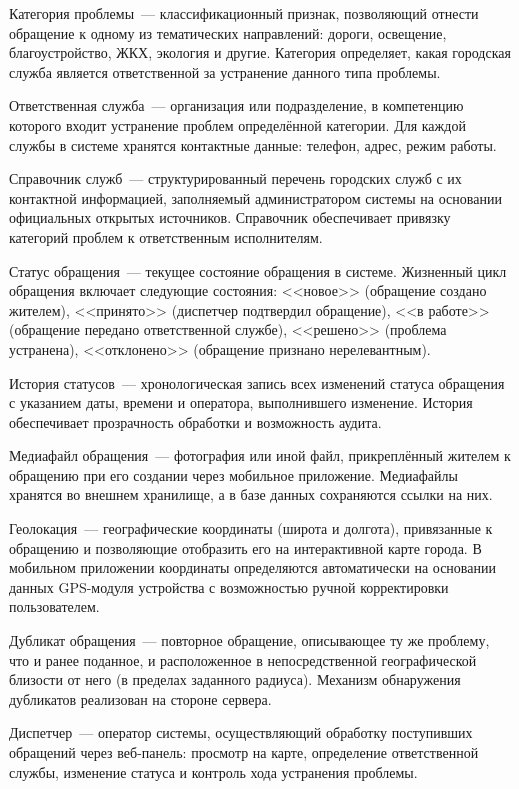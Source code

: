 Категория проблемы~--- классификационный признак, позволяющий отнести обращение к одному из тематических направлений: дороги, освещение, благоустройство, ЖКХ, экология и другие. Категория определяет, какая городская служба является ответственной за устранение данного типа проблемы.

Ответственная служба~--- организация или подразделение, в компетенцию которого входит устранение проблем определённой категории. Для каждой службы в системе хранятся контактные данные: телефон, адрес, режим работы.

Справочник служб~--- структурированный перечень городских служб с их контактной информацией, заполняемый администратором системы на основании официальных открытых источников. Справочник обеспечивает привязку категорий проблем к ответственным исполнителям.

Статус обращения~--- текущее состояние обращения в системе. Жизненный цикл обращения включает следующие состояния: <<новое>> (обращение создано жителем), <<принято>> (диспетчер подтвердил обращение), <<в работе>> (обращение передано ответственной службе), <<решено>> (проблема устранена), <<отклонено>> (обращение признано нерелевантным).

История статусов~--- хронологическая запись всех изменений статуса обращения с указанием даты, времени и оператора, выполнившего изменение. История обеспечивает прозрачность обработки и возможность аудита.

Медиафайл обращения~--- фотография или иной файл, прикреплённый жителем к обращению при его создании через мобильное приложение. Медиафайлы хранятся во внешнем хранилище, а в базе данных сохраняются ссылки на них.

Геолокация~--- географические координаты (широта и долгота), привязанные к обращению и позволяющие отобразить его на интерактивной карте города. В мобильном приложении координаты определяются автоматически на основании данных GPS-модуля устройства с возможностью ручной корректировки пользователем.

Дубликат обращения~--- повторное обращение, описывающее ту же проблему, что и ранее поданное, и расположенное в непосредственной географической близости от него (в пределах заданного радиуса). Механизм обнаружения дубликатов реализован на стороне сервера.

Диспетчер~--- оператор системы, осуществляющий обработку поступивших обращений через веб-панель: просмотр на карте, определение ответственной службы, изменение статуса и контроль хода устранения проблемы.

